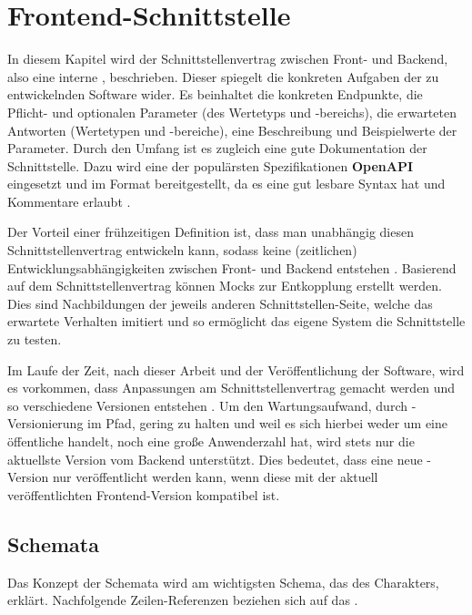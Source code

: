 \section{Frontend-Schnittstelle}\label{sec:frontend-schnittstelle}

In diesem Kapitel wird der Schnittstellenvertrag zwischen Front- und Backend, also eine interne , beschrieben.
Dieser spiegelt die konkreten Aufgaben der zu entwickelnden Software wider.
Es beinhaltet \uA die konkreten Endpunkte, die Pflicht- und optionalen Parameter (\inkl des Wertetyps und -bereichs), die erwarteten Antworten (\inkl Wertetypen und -bereiche), eine Beschreibung und Beispielwerte der Parameter.
Durch den Umfang ist es zugleich eine gute Dokumentation der Schnittstelle.
Dazu wird eine der populärsten Spezifikationen \textbf{OpenAPI} eingesetzt und im Format \textbf{} bereitgestellt, da es eine gut lesbare Syntax hat und Kommentare erlaubt .

Der Vorteil einer frühzeitigen Definition ist, dass man unabhängig  diesen Schnittstellenvertrag entwickeln kann, sodass keine (zeitlichen) Entwicklungsabhängigkeiten zwischen Front- und Backend entstehen .
Basierend auf dem Schnittstellenvertrag können \sog Mocks zur Entkopplung erstellt werden.
Dies sind Nachbildungen der jeweils anderen Schnittstellen-Seite, welche das erwartete Verhalten imitiert und so ermöglicht das eigene System  die Schnittstelle zu testen.

Im Laufe der Zeit, nach dieser Arbeit und der Veröffentlichung der Software, wird es vorkommen, dass Anpassungen am Schnittstellenvertrag gemacht werden und so verschiedene Versionen entstehen .
Um den Wartungsaufwand, \zB durch -Versionierung im Pfad, gering zu halten und weil es sich hierbei weder um eine öffentliche  handelt, noch eine große Anwenderzahl hat, wird stets nur die aktuellste Version vom Backend unterstützt.
Dies bedeutet, dass eine neue -Version nur veröffentlicht werden kann, wenn diese mit der aktuell veröffentlichten Frontend-Version kompatibel ist.


\subsection{Schemata}\label{subsec:schemata}

Das Konzept der Schemata wird am wichtigsten Schema, das des Charakters, erklärt.
Nachfolgende Zeilen-Referenzen beziehen sich auf das .

